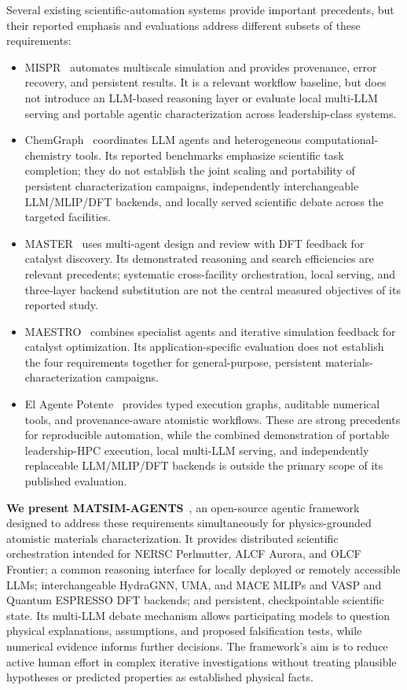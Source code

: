 \documentclass[11pt,a4paper]{article}
\begin{document}
Several existing scientific-automation systems provide important precedents, but their reported emphasis and evaluations address different subsets of these requirements:
\begin{itemize}
\setlength{\itemsep}{2pt}
\item MISPR~\cite{atwi2022mispr} automates multiscale simulation and provides provenance, error recovery, and persistent results. It is a relevant workflow baseline, but does not introduce an LLM-based reasoning layer or evaluate local multi-LLM serving and portable agentic characterization across leadership-class systems.
\item ChemGraph~\cite{chemgraph2026} coordinates LLM agents and heterogeneous computational-chemistry tools. Its reported benchmarks emphasize scientific task completion; they do not establish the joint scaling and portability of persistent characterization campaigns, independently interchangeable LLM/MLIP/DFT backends, and locally served scientific debate across the targeted facilities.
\item MASTER~\cite{master2026} uses multi-agent design and review with DFT feedback for catalyst discovery. Its demonstrated reasoning and search efficiencies are relevant precedents; systematic cross-facility orchestration, local serving, and three-layer backend substitution are not the central measured objectives of its reported study.
\item MAESTRO~\cite{maestro2026} combines specialist agents and iterative simulation feedback for catalyst optimization. Its application-specific evaluation does not establish the four requirements together for general-purpose, persistent materials-characterization campaigns.
\item El Agente Potente~\cite{potente2026} provides typed execution graphs, auditable numerical tools, and provenance-aware atomistic workflows. These are strong precedents for reproducible automation, while the combined demonstration of portable leadership-HPC execution, local multi-LLM serving, and independently replaceable LLM/MLIP/DFT backends is outside the primary scope of its published evaluation.
\end{itemize}

\textbf{We present MATSIM-AGENTS}~\cite{osti-code-181158}, an open-source agentic framework designed to address these requirements simultaneously for physics-grounded atomistic materials characterization. It provides distributed scientific orchestration intended for NERSC Perlmutter, ALCF Aurora, and OLCF Frontier; a common reasoning interface for locally deployed or remotely accessible LLMs; interchangeable HydraGNN, UMA, and MACE MLIPs and VASP and Quantum ESPRESSO DFT backends; and persistent, checkpointable scientific state. Its multi-LLM debate mechanism allows participating models to question physical explanations, assumptions, and proposed falsification tests, while numerical evidence informs further decisions. The framework's aim is to reduce active human effort in complex iterative investigations without treating plausible hypotheses or predicted properties as established physical facts.
\end{document}
